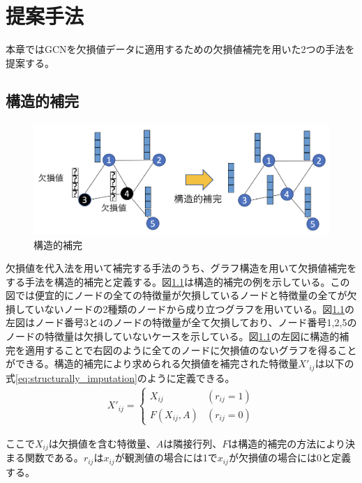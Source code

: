 \chapter{提案手法}
本章ではGCNを欠損値データに適用するための欠損値補完を用いた2つの手法を提案する。

\section{構造的補完}
\label{sec:structurally_imputation}
\begin{figure}[h]
  \centering
  \includegraphics[width=1\hsize]{figures/structurally_imputation.png}
  \caption{構造的補完}
  \label{fig:structurally_imputation}
\end{figure}
欠損値を代入法を用いて補完する手法のうち、グラフ構造を用いて欠損値補完をする手法を構造的補完と定義する。図\ref{fig:structurally_imputation}は構造的補完の例を示している。この図では便宜的にノードの全ての特徴量が欠損しているノードと特徴量の全てが欠損していないノードの2種類のノードから成り立つグラフを用いている。図\ref{fig:structurally_imputation}の左図はノード番号3と4のノードの特徴量が全て欠損しており、ノード番号1,2,5のノードの特徴量は欠損していないケースを示している。図\ref{fig:structurally_imputation}の左図に構造的補完を適用することで右図のように全てのノードに欠損値のないグラフを得ることができる。構造的補完により求められる欠損値を補完された特徴量$X'_{ij}$は以下の式\eqref{eq:structurally_imputation}のように定義できる。
\begin{align} \label{eq:structurally_imputation}
    X'_{ij} =
    \begin{cases}
      X_{ij}&  (r_{ij} = 1) \\
      F(X_{ij},A)  & (r_{ij} = 0)
    \end{cases}
\end{align}

ここで$X_{ij}$は欠損値を含む特徴量、$A$は隣接行列、$F$は構造的補完の方法により決まる関数である。$r_{ij}$は$x_{ij}$が観測値の場合には1で$x_{ij}$が欠損値の場合には0と定義する。

